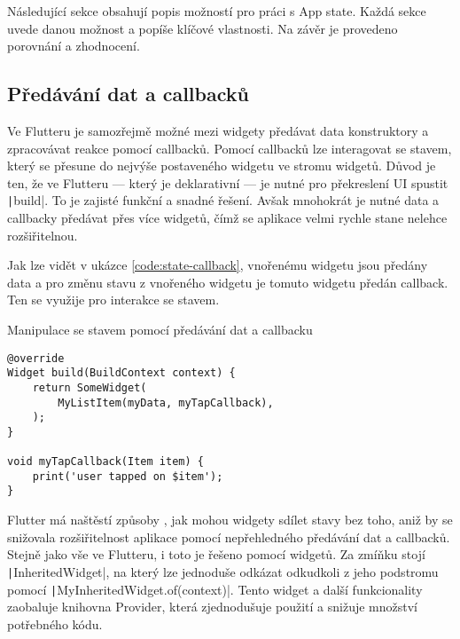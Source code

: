 Následující sekce obsahují popis možností pro práci s App state.
Každá sekce uvede danou možnost a popíše klíčové vlastnosti.
Na závěr je provedeno porovnání a zhodnocení.

\subsection{Předávání dat a callbacků}
\label{sec:data-callback-transfer}

Ve Flutteru je samozřejmě možné \cite{flutter_state_mgmt_simple} mezi widgety
předávat data konstruktory
a zpracovávat reakce pomocí callbacků. 
Pomocí callbacků lze interagovat se stavem,
který se přesune do nejvýše postaveného widgetu ve stromu widgetů.
Důvod je ten,
že ve Flutteru
--- který je deklarativní ---
je nutné pro překreslení UI spustit \texttt|build|.
To je zajisté funkční a snadné řešení.
Avšak mnohokrát je nutné data a callbacky předávat přes více widgetů,
čímž se aplikace velmi rychle stane nelehce rozšiřitelnou.

Jak lze vidět v ukázce \ref{code:state-callback},
vnořenému widgetu jsou předány data
a pro změnu stavu z vnořeného widgetu je tomuto widgetu předán callback.
Ten se využije pro interakce se stavem.

\begin{listing}
    \caption{Manipulace se stavem pomocí předávání dat a callbacku
\cite{flutter_state_mgmt_simple}}
    \label{code:state-callback}
    \begin{verbatim}
@override
Widget build(BuildContext context) {
    return SomeWidget(
        MyListItem(myData, myTapCallback),
    );
}

void myTapCallback(Item item) {
    print('user tapped on $item');
}
    \end{verbatim}
\end{listing}

Flutter má naštěstí způsoby \cite{flutter_state_mgmt_simple},
jak mohou widgety sdílet stavy bez toho,
aniž by se snižovala rozšiřitelnost aplikace pomocí nepřehledného předávání
dat a callbacků.
Stejně jako vše ve Flutteru,
i toto je řešeno pomocí widgetů.
Za zmíňku stojí \texttt|InheritedWidget|,
na který lze jednoduše odkázat odkudkoli z jeho podstromu pomocí
\texttt|MyInheritedWidget.of(context)|.
Tento widget a další funkcionality zaobaluje knihovna Provider,
která zjednodušuje použití a snižuje množství potřebného kódu.

